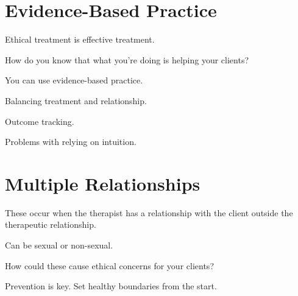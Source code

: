 \section{Evidence-Based Practice}

\begin{coloredlist}
    \item Ethical treatment is effective treatment.
    \item How do you know that what you're doing is helping your clients?
    \begin{coloredlist}
        \item You can use evidence-based practice.
        \begin{coloredlist}
            \item Balancing treatment and relationship.
        \end{coloredlist}
        \item Outcome tracking.
        \item Problems with relying on intuition.
    \end{coloredlist}
\end{coloredlist}

\section{Multiple Relationships}

\begin{coloredlist}
    \item These occur when the therapist has a relationship with the client outside the therapeutic relationship.
    \item Can be sexual or non-sexual.
    \item How could these cause ethical concerns for your clients?
    \item Prevention is key. Set healthy boundaries from the start.
\end{coloredlist}

